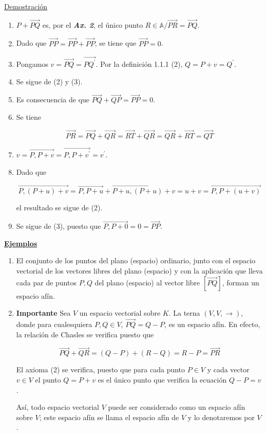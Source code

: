 \documentclass[12pt, a4paper, ones, notitlepage, openany,titlepage]{article}
\newcommand{\ejemplos}{\noindent\underline{\textbf{Ejemplos}}}
\begin{document}
\noindent\underline{Demostración}
\begin{enumerate}[label=(\arabic*)]
\item $P + \overrightarrow{PQ}$ es, por el \textbf{\textit{Ax. 2}}, el único punto $R \in \mathbb{A} / \overrightarrow{PR} = \overrightarrow{PQ}$.

\item Dado que $\overrightarrow{P P}=\overrightarrow{P P}+\overrightarrow{P P}$, se tiene que $\overrightarrow{P P}=0$.

\item Pongamos $v=\overrightarrow{P Q}=\overrightarrow{P Q^{\prime}}$. Por la definición 1.1.1 (2), $Q=P+v=Q^{\prime}$.

\item Se sigue de (2) y (3).

\item Es consecuencia de que $\overrightarrow{P Q}+\overrightarrow{Q P}=\overrightarrow{P P}=0$.

\item Se tiene

$$
\overrightarrow{P R}=\overrightarrow{P Q}+\overrightarrow{Q R}=\overrightarrow{R T}+\overrightarrow{Q R}=\overrightarrow{Q R}+\overrightarrow{R T}=\overrightarrow{Q T}
$$

\item $v=\overrightarrow{P, P+v}=\overrightarrow{P, P+v^{\prime}}=v^{\prime}$.

\item Dado que

$$
\overrightarrow{P,(P+u)+v}=\overrightarrow{P, P+u}+\overrightarrow{P+u,(P+u)+v}=u+v=\overrightarrow{P, P+(u+v)}
$$

el resultado se sigue de (2).

\item Se sigue de (3), puesto que $\overrightarrow{P, P+0}=0=\overrightarrow{P P}$.
\end{enumerate}

\ejemplos
\begin{enumerate}
\item El conjunto de los puntos del plano (espacio) ordinario, junto con el espacio vectorial de los vectores libres del plano (espacio) y con la aplicación que lleva cada par de puntos $P, Q$ del plano (espacio) al vector libre $[\overrightarrow{P Q}]$, forman un espacio afín.

\item \textbf{Importante} Sea $V$ un espacio vectorial sobre $K$. La terna $(V, V, \rightarrow)$, donde para cualesquiera $P, Q \in V$, $\overrightarrow{P Q}=Q-P$, es un espacio afín. En efecto, la relación de Chasles se verifica puesto que

$$
\overrightarrow{P Q}+\overrightarrow{Q R}=(Q-P)+(R-Q)=R-P=\overrightarrow{P R}
$$

El axioma (2) se verifica, puesto que para cada punto $P \in V$ y cada vector $v \in V$ el punto $Q=P+v$ es el único punto que verifica la ecuación $Q-P=v$.

Así, todo espacio vectorial $V$ puede ser considerado como un espacio afín sobre $V$; este espacio afín se llama el espacio afín de $V$ y lo denotaremos por $V$.
\end{enumerate}
\end{document}
